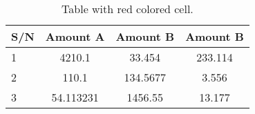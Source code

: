 \documentclass{article}
\begin{document}
 \begin{table}[h!]
		\begin{center}
			\caption{Table with red colored cell.}
	\label{tab:table1}
\begin{tabular}{l|S|S|c}
	\hline
\textbf{S/N} & \textbf{Amount A}
& \textbf{Amount B} & \textbf{Amount B}\\
\hline
{}1 & 4210.1 & 33.454 & 233.114\\
2 & 110.1 & 134.5677 & 3.556\\
3 & 54.113231 & 1456.55 & 13.177\\
\end{tabular}
\end{center}
\end{table}

	
\end{document}
